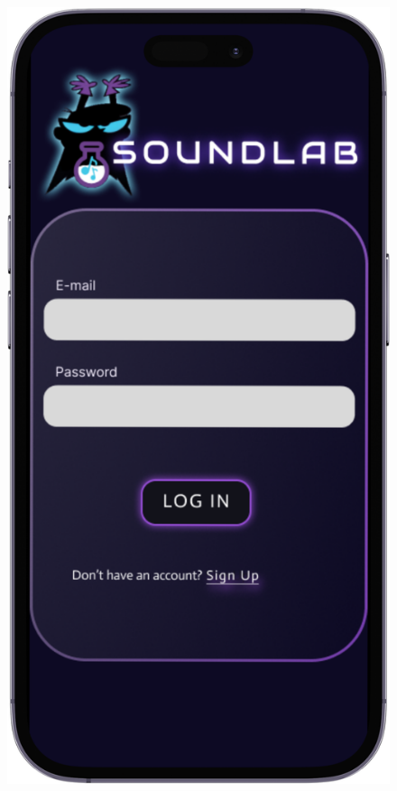 \documentclass{article}
\begin{document}
\begin{figure}[htbp]
				\hfill
				\begin{minipage}{0.18\textwidth}
					\includegraphics[width=\textwidth]{foto2}
				\end{minipage}
				\hfill
				\begin{minipage}{0.18\textwidth}

\end{minipage}
\end{figure}
\end{document}
